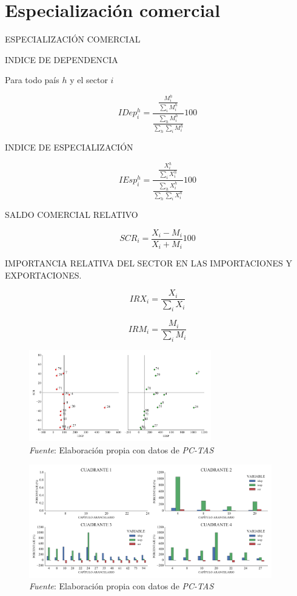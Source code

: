 \documentclass[a4paper,openright,12pt]{book}
\begin{document}
\chapter{Especialización comercial}

ESPECIALIZACIÓN COMERCIAL

INDICE DE DEPENDENCIA

Para todo país $h$ y el sector $i$

\begin{equation}
IDep^h_i = \frac{\frac{M^h_i}{\sum_i M^h_i}}{\frac{\sum_h M^h_i}{\sum_h \sum_i M^h_i}} 100
\end{equation}

INDICE DE ESPECIALIZACIÓN

\begin{equation}
IEsp^h_i = \frac{\frac{X^h_i}{\sum_i X^h_i}}{\frac{\sum_h X^h_i}{\sum_h \sum_i X^h_i}} 100
\end{equation}

SALDO COMERCIAL RELATIVO

\begin{equation}
SCR_i = \frac{X_i - M_i}{X_i + M_i} 100
\end{equation}

IMPORTANCIA RELATIVA DEL SECTOR EN LAS IMPORTACIONES Y EXPORTACIONES.

\begin{equation}
IRX_i = \frac{X_i}{\sum_i X_i}
\end{equation}

\begin{equation}
IRM_i = \frac{M_i}{\sum_i M_i}
\end{equation}

\begin{figure}[!ht]
    \centering
    \caption{}
    \includegraphics[width=300px]{cuadrantes2.pdf}
    \caption*{\textit{Fuente}: Elaboración propia con datos de \textit{PC-TAS}}
    \label{}
\end{figure}


\begin{figure}[!ht]
    \centering
    \caption{}
    \includegraphics[width=400px]{cuadrantes.pdf}
    \caption*{\textit{Fuente}: Elaboración propia con datos de \textit{PC-TAS}}
    \label{}
\end{figure}
\end{document}
